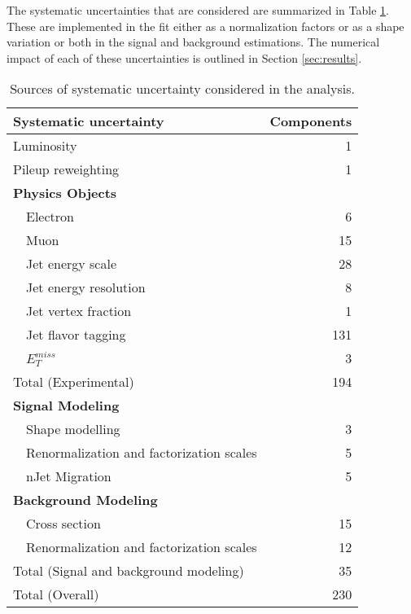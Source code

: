 
The systematic uncertainties that are considered are summarized in Table \ref{tab:SystSummary}. These are implemented in the fit either as a normalization factors or as a shape variation or both in the signal and background estimations. The numerical impact of each of these uncertainties is outlined in Section \ref{sec:results}.

\begin{table}[H]
\centering
\caption{Sources of systematic uncertainty considered in the analysis.}
\begin{tabular}{lr}
\hline\hline
Systematic uncertainty & Components  	      \\
\hline
\hline
Luminosity	& 1		      \\
Pileup reweighting 	& 1		      \\
\textbf {Physics Objects}     	&		      \\
\ \ Electron                               	& 6		      \\
\ \ Muon	& 15		      \\
\ \ Jet energy scale   	& 28                  \\
\ \ Jet energy resolution & 8 \\
\ \ Jet vertex fraction  	& 1		      \\
\ \ Jet flavor tagging   	& 131		      \\
\ \ $E^{miss}_T$  	& 3		      \\
\hline
Total (Experimental)        & 194		     \\
\hline
\hline
\textbf {Signal Modeling}           &                     \\
\ \ Shape modelling & 3 \\
\ \ Renormalization and factorization scales    & 5                  \\
\ \ nJet Migration & 5 \\
\textbf {Background Modeling}          	&		      \\
\ \ Cross section                 	& 15		      \\
\ \ Renormalization and factorization scales 	& 12		      \\
\hline
Total (Signal and background modeling)       &  35		     \\
\hline\hline
Total (Overall)                             & 230	      \\
\hline\hline
\end{tabular}
\label{tab:SystSummary}
\end{table}

